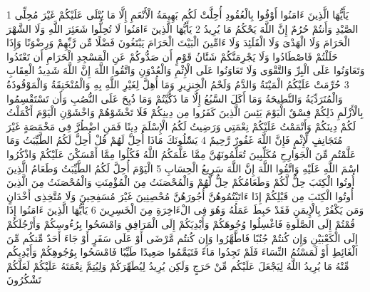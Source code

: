 \documentclass[20pt,a4paper]{article}
\title{}
\author{}
\date{}
\begin{document}
\pagecolor{cl_page}



{\tiny\colorbox{cl_aya}{1}} يَأَيُّهَا الَّذِينَ ءَامَنُوا أَوْفُوا بِالْعُقُودِ أُحِلَّتْ لَكُم بَهِيمَةُ الْأَنْعَمِ إِلَّا مَا يُتْلَى عَلَيْكُمْ غَيْرَ مُحِلِّى الصَّيْدِ وَأَنتُمْ حُرُمٌ إِنَّ اللَّهَ يَحْكُمُ مَا يُرِيدُ
{\tiny\colorbox{cl_aya}{2}} يَأَيُّهَا الَّذِينَ ءَامَنُوا لَا تُحِلُّوا شَعَئِرَ اللَّهِ وَلَا الشَّهْرَ الْحَرَامَ وَلَا الْهَدْىَ وَلَا الْقَلَئِدَ وَلَا ءَامِّينَ الْبَيْتَ الْحَرَامَ يَبْتَغُونَ فَضْلًا مِّن رَّبِّهِمْ وَرِضْوَنًا وَإِذَا حَلَلْتُمْ فَاصْطَادُوا وَلَا يَجْرِمَنَّكُمْ شَنََٔانُ قَوْمٍ أَن صَدُّوكُمْ عَنِ الْمَسْجِدِ الْحَرَامِ أَن تَعْتَدُوا وَتَعَاوَنُوا عَلَى الْبِرِّ وَالتَّقْوَى وَلَا تَعَاوَنُوا عَلَى الْإِثْمِ وَالْعُدْوَنِ وَاتَّقُوا اللَّهَ إِنَّ اللَّهَ شَدِيدُ الْعِقَابِ
{\tiny\colorbox{cl_aya}{3}} حُرِّمَتْ عَلَيْكُمُ الْمَيْتَةُ وَالدَّمُ وَلَحْمُ الْخِنزِيرِ وَمَا أُهِلَّ لِغَيْرِ اللَّهِ بِهِ وَالْمُنْخَنِقَةُ وَالْمَوْقُوذَةُ وَالْمُتَرَدِّيَةُ وَالنَّطِيحَةُ وَمَا أَكَلَ السَّبُعُ إِلَّا مَا ذَكَّيْتُمْ وَمَا ذُبِحَ عَلَى النُّصُبِ وَأَن تَسْتَقْسِمُوا بِالْأَزْلَمِ ذَلِكُمْ فِسْقٌ الْيَوْمَ يَئِسَ الَّذِينَ كَفَرُوا مِن دِينِكُمْ فَلَا تَخْشَوْهُمْ وَاخْشَوْنِ الْيَوْمَ أَكْمَلْتُ لَكُمْ دِينَكُمْ وَأَتْمَمْتُ عَلَيْكُمْ نِعْمَتِى وَرَضِيتُ لَكُمُ الْإِسْلَمَ دِينًا فَمَنِ اضْطُرَّ فِى مَخْمَصَةٍ غَيْرَ مُتَجَانِفٍ لِّإِثْمٍ فَإِنَّ اللَّهَ غَفُورٌ رَّحِيمٌ
{\tiny\colorbox{cl_aya}{4}} يَسَْٔلُونَكَ مَاذَا أُحِلَّ لَهُمْ قُلْ أُحِلَّ لَكُمُ الطَّيِّبَتُ وَمَا عَلَّمْتُم مِّنَ الْجَوَارِحِ مُكَلِّبِينَ تُعَلِّمُونَهُنَّ مِمَّا عَلَّمَكُمُ اللَّهُ فَكُلُوا مِمَّا أَمْسَكْنَ عَلَيْكُمْ وَاذْكُرُوا اسْمَ اللَّهِ عَلَيْهِ وَاتَّقُوا اللَّهَ إِنَّ اللَّهَ سَرِيعُ الْحِسَابِ
{\tiny\colorbox{cl_aya}{5}} الْيَوْمَ أُحِلَّ لَكُمُ الطَّيِّبَتُ وَطَعَامُ الَّذِينَ أُوتُوا الْكِتَبَ حِلٌّ لَّكُمْ وَطَعَامُكُمْ حِلٌّ لَّهُمْ وَالْمُحْصَنَتُ مِنَ الْمُؤْمِنَتِ وَالْمُحْصَنَتُ مِنَ الَّذِينَ أُوتُوا الْكِتَبَ مِن قَبْلِكُمْ إِذَا ءَاتَيْتُمُوهُنَّ أُجُورَهُنَّ مُحْصِنِينَ غَيْرَ مُسَفِحِينَ وَلَا مُتَّخِذِى أَخْدَانٍ وَمَن يَكْفُرْ بِالْإِيمَنِ فَقَدْ حَبِطَ عَمَلُهُ وَهُوَ فِى الْءَاخِرَةِ مِنَ الْخَسِرِينَ
{\tiny\colorbox{cl_aya}{6}} يَأَيُّهَا الَّذِينَ ءَامَنُوا إِذَا قُمْتُمْ إِلَى الصَّلَوةِ فَاغْسِلُوا وُجُوهَكُمْ وَأَيْدِيَكُمْ إِلَى الْمَرَافِقِ وَامْسَحُوا بِرُءُوسِكُمْ وَأَرْجُلَكُمْ إِلَى الْكَعْبَيْنِ وَإِن كُنتُمْ جُنُبًا فَاطَّهَّرُوا وَإِن كُنتُم مَّرْضَى أَوْ عَلَى سَفَرٍ أَوْ جَاءَ أَحَدٌ مِّنكُم مِّنَ الْغَائِطِ أَوْ لَمَسْتُمُ النِّسَاءَ فَلَمْ تَجِدُوا مَاءً فَتَيَمَّمُوا صَعِيدًا طَيِّبًا فَامْسَحُوا بِوُجُوهِكُمْ وَأَيْدِيكُم مِّنْهُ مَا يُرِيدُ اللَّهُ لِيَجْعَلَ عَلَيْكُم مِّنْ حَرَجٍ وَلَكِن يُرِيدُ لِيُطَهِّرَكُمْ وَلِيُتِمَّ نِعْمَتَهُ عَلَيْكُمْ لَعَلَّكُمْ تَشْكُرُونَ
\end{document}
